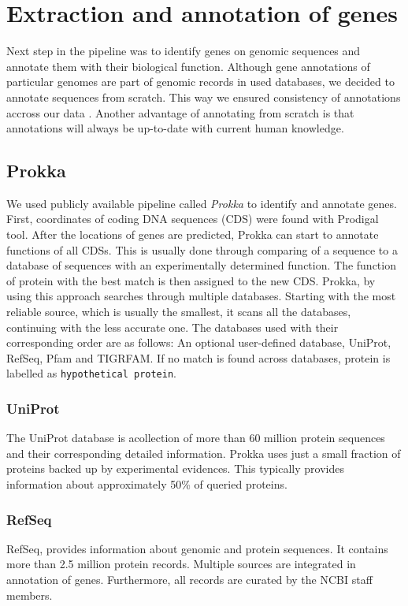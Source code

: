 \section{Extraction and annotation of genes}
Next step in the pipeline was to identify genes on genomic sequences and annotate them with their biological function.
Although gene annotations of particular genomes are part of genomic records in used databases, we decided to annotate sequences from scratch.
This way we ensured consistency of annotations accross our data .
Another advantage of annotating from scratch is that annotations will always be up-to-date with current human knowledge.

\subsection{Prokka}
We used publicly available pipeline called \emph{Prokka} \cite{prokka} to identify and annotate genes.
First, coordinates of coding DNA sequences (CDS) were found with Prodigal tool\cite{prodigal}.
After the locations of genes are predicted, Prokka can start to annotate functions of all CDSs.
This is usually done through comparing of a sequence to a database of sequences with an experimentally determined function.
The function of protein with the best match is then assigned to the new CDS.
Prokka, by using this approach searches through multiple databases.
Starting with the most reliable source, which is usually the smallest, it scans all the databases, continuing with the less accurate one.
The databases used with their corresponding order are as follows:
An optional user-defined database, UniProt\cite{uniprot}, RefSeq\cite{refseq}, Pfam\cite{pfam} and TIGRFAM\cite{tigrfam}.
If no match is found across databases, protein is labelled as \verb|hypothetical protein|.


\subsubsection{UniProt}
The UniProt database is acollection of more than 60 million protein sequences and their corresponding detailed information.
Prokka uses just a small fraction of proteins backed up by experimental evidences.
This typically provides information about approximately 50\% of queried proteins.

\subsubsection{RefSeq}
RefSeq, provides information about genomic and protein sequences.
It contains more than 2.5 million protein records.
Multiple sources are integrated in annotation of genes.
Furthermore, all records are curated by the NCBI staff members.

